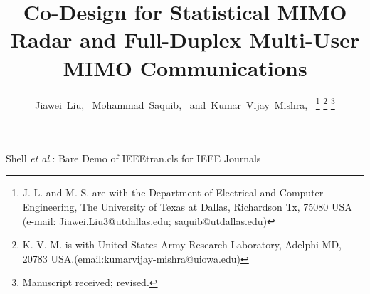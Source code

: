 \documentclass[9pt,journal]{IEEEtran}
\begin{document}
	\title{Co-Design for Statistical MIMO Radar and Full-Duplex Multi-User MIMO Communications}
	\author{Jiawei~Liu,~
		Mohammad~Saquib,~
		and~Kumar~Vijay~Mishra,~%
		\thanks{J. L. and M. S. are with the Department
			of Electrical and Computer Engineering, The University of Texas at Dallas, Richardson
			Tx, 75080 USA (e-mail: Jiawei.Liu3@utdallas.edu; saquib@utdallas.edu)}%
		\thanks{K. V. M. is with United States Army Research Laboratory, Adelphi MD, 20783 USA.(email:kumarvijay-mishra@uiowa.edu)}%
		\thanks{Manuscript received; revised.}}
	
	{Shell \MakeLowercase{\textit{et al.}}: Bare Demo of IEEEtran.cls for IEEE Journals}
	
	
	
	
	
	
	
	
	
	
	
	\maketitle
	
\end{document}
